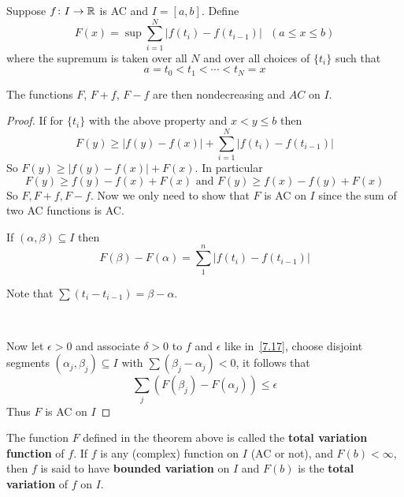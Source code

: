     \begin{theorem}
        Suppose $f\colon I\rightarrow \mathbb{R}$ is AC and $I = [a,b]$. Define\[
            F(x) = \sup \sum_{i=1}^N|f(t_i)-f(t_{i-1})| \text{ } (a\leq x\leq b)   
        \]
        where the supremum is taken over all $N$ and over all choices of $\{t_i\}$ such that \[
            a=t_0<t_1<\cdots<t_N=x    
        \]

        The functions $F$, $F+f$, $F-f$ are then nondecreasing and $AC$ on $I$.
        \begin{proof}
            If for $\{t_i\}$ with the above property and $x<y\leq b$ then \[
                F(y)\geq |f(y)-f(x)|+\sum_{i=1}^N |f(t_i) - f(t_{i-1})|    
            \]
            So $F(y)\geq |f(y)-f(x)|+F(x)$. In particular \[
                F(y) \geq f(y)-f(x)+F(x)\text{ and }F(y)\geq f(x)-f(y)+F(x)    
            \]
            So $F,F+f,F-f$. Now we only need to show that $F$ is AC on $I$ since the sum of two AC functions is AC.

            If $(\alpha,\beta)\subseteq I$ then \[
                F(\beta)-F(\alpha) = \sum_{1}^n |f(t_i)-f(t_{i-1})|    
            \]

            Note that $\sum (t_i-t_{i-1}) = \beta - \alpha$.

            \

            Now let $\epsilon>0$ and associate $\delta>0$ to $f$ and $\epsilon$ like in~\ref{7.17}, choose disjoint segments $(\alpha_j,\beta_j)\subseteq I$ with $\sum(\beta_j-\alpha_j)<0$, it follows that\[
                \sum_j (F(\beta_j)-F(\alpha_j))\leq \epsilon    
            \]
            Thus $F$ is AC on $I$
        \end{proof}
    \end{theorem}

    \begin{definition}
        The function $F$ defined in the theorem above is called the \textbf{total variation function} of $f$. If $f$ is any (complex) function on $I$ (AC or not), and $F(b)<\infty$, then $f$ is said to have \textbf{bounded variation} on $I$ and $F(b)$ is the \textbf{total variation} of $f$ on $I$.
    \end{definition}

